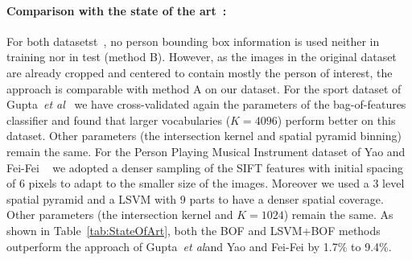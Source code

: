 \documentclass{bmvc2k}
\def\etal{\emph{et al}\bmvaOneDot}
\begin{document}

\paragraph{Comparison with the state of the art~\cite{Gupta09,FeiFei10a, FeiFei10b}:}
For both datasetst~\cite{Gupta09,FeiFei10a}, no person bounding box information is used neither in training
nor in test (method B). However, as the images in the original dataset
are already cropped and centered to contain mostly the person of
interest, the approach is comparable with method A on our dataset.
For the sport dataset of Gupta~\etal~\cite{Gupta09} we have
cross-validated again the parameters of the bag-of-features classifier
and found that larger vocabularies ($K=4096$) perform better on this
dataset. Other parameters (the intersection kernel and spatial
pyramid binning) remain the same.
For the Person Playing Musical Instrument dataset of Yao and Fei-Fei ~\cite{FeiFei10a}
we adopted a denser sampling of the SIFT features with initial spacing of 6 pixels to adapt
to the smaller size of the images. Moreover we used a 3 level spatial pyramid and a LSVM
with 9 parts to have a denser spatial coverage. Other parameters (the intersection kernel 
and $K=1024$) remain the same.
As shown in Table~\ref{tab:StateOfArt}, both the BOF and LSVM+BOF methods
outperform the approach of Gupta~\etal and Yao and Fei-Fei by 1.7\% to 9.4\%.
\end{document}
